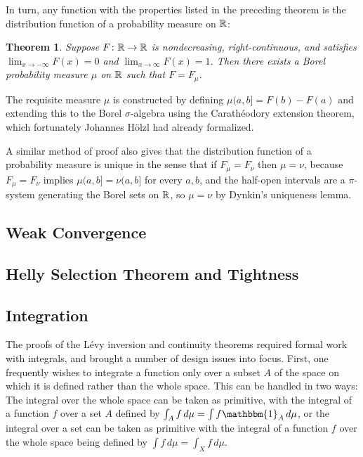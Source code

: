 \documentclass{amsart}
\newtheorem{theorem}{Theorem}[section]
\theoremstyle{definition}
\theoremstyle{remark}
\begin{document}
In turn, any function with the properties listed in the preceding theorem is the distribution function of a probability measure on $\mathbb{R}$:

\begin{theorem}
Suppose $F\colon \mathbb{R} \rightarrow \mathbb{R}$ is nondecreasing, right-continuous, and satisfies $\lim_{x \rightarrow -\infty} F(x) = 0$ and $\lim_{x \rightarrow \infty} F(x) = 1$. Then there exists a Borel probability measure $\mu$ on $\mathbb{R}$ such that $F = F_\mu$.
\end{theorem}

The requisite measure $\mu$ is constructed by defining $\mu (a,b] = F(b) - F(a)$ and extending this to the Borel $\sigma$-algebra using the Carath\'eodory extension theorem, which fortunately Johannes H\"olzl had already formalized. 

A similar method of proof also gives that the distribution function of a probability measure is unique in the sense that if $F_\mu = F_\nu$ then $\mu = \nu$, because $F_\mu = F_\nu$ implies $\mu (a,b] = \nu (a,b]$ for every $a,b$, and the half-open intervals are a $\pi$-system generating the Borel sets on $\mathbb{R}$, so $\mu = \nu$ by Dynkin's uniqueness lemma.


\subsection{Weak Convergence}



\subsection{Helly Selection Theorem and Tightness}



\subsection{Integration}

The proofs of the L\'evy inversion and continuity theorems required formal work with integrals, and brought a number of design issues into focus. First, one frequently wishes to integrate a function only over a subset $A$ of the space on which it is defined rather than the whole space. This can be handled in two ways: The integral over the whole space can be taken as primitive, with the integral of a function $f$ over a set $A$ defined by $\int_A f \, d\mu = \int f \mathbbm{1}_A \, d\mu$, or the integral over a set can be taken as primitive with the integral of a function $f$ over the whole space being defined by $\int f \, d\mu = \int_X f \, d\mu$.
\end{document}
